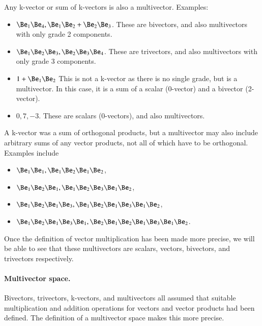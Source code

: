 Any k-vector or sum of k-vectors is also a multivector.  Examples:
\begin{itemize}
\item
\(\Be_1 \Be_4, \Be_1 \Be_2 + \Be_2 \Be_3\).  These are bivectors, and also multivectors with only grade 2 components.
\item
\(\Be_1 \Be_2 \Be_3, \Be_2 \Be_3 \Be_4\).  These are trivectors, and also multivectors with only grade 3 components.
\item
\(1 + \Be_1 \Be_2\)  This is not a k-vector as there is no single grade, but is a multivector.  In this case, it is a sum of a scalar (0-vector) and a bivector (2-vector).
\item
\(0, 7, -3\). These are scalars (0-vectors), and also multivectors.
\end{itemize}
A k-vector was a sum of orthogonal products, but a multivector may also include arbitrary sums of any vector products, not all of which have to be orthogonal.  Examples include
\begin{itemize}
\item
\( \Be_1 \Be_1, \Be_1 \Be_2 \Be_1 \Be_2 \),
\item
\( \Be_1 \Be_2 \Be_1, \Be_1 \Be_2 \Be_3 \Be_1 \Be_2 \),
\item
\( \Be_1 \Be_2 \Be_1 \Be_3, \Be_1 \Be_2 \Be_1 \Be_3 \Be_1 \Be_2 \),
\item
\( \Be_1 \Be_2 \Be_1 \Be_3 \Be_1, \Be_2 \Be_1 \Be_2 \Be_1 \Be_3 \Be_1 \Be_2 \).
\end{itemize}
Once the definition of vector multiplication has been made more precise, we will be able to see that these multivectors are scalars, vectors, bivectors, and trivectors respectively.

\paragraph{Multivector space.}

Bivectors, trivectors, k-vectors, and multivectors all assumed that suitable multiplication and addition operations for vectors and vector products had been defined.  The definition of a multivector space makes this more precise.

